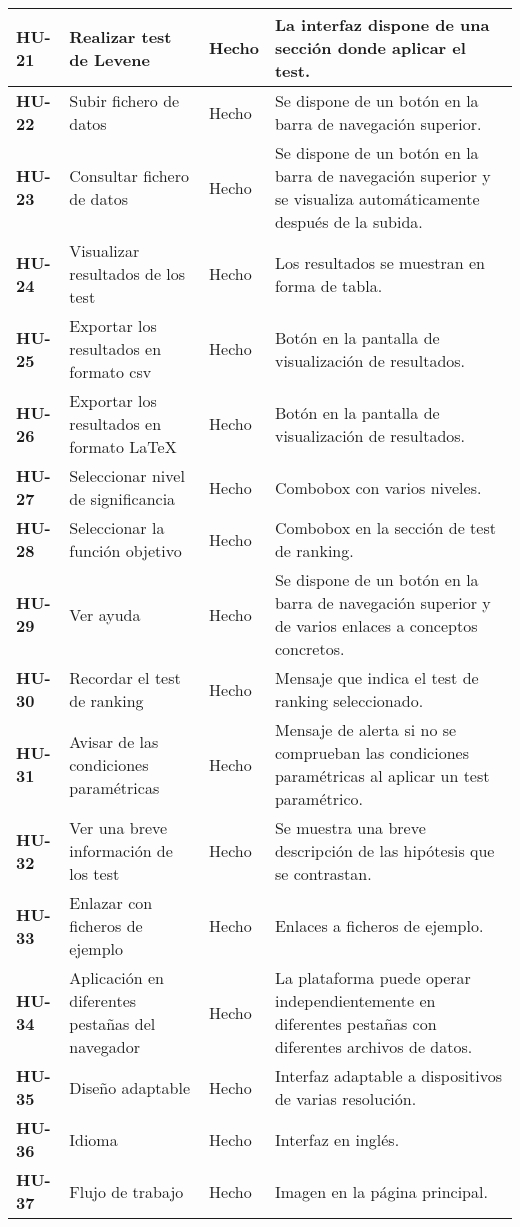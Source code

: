\begin{center}
\begin{longtable}[H]{| p{2cm} | p{4.25cm} | p{1cm} | p{5cm} |}
	\textbf{HU-21} & Realizar test de Levene & Hecho & La interfaz dispone de una sección donde aplicar el test. \\ \hline
	\textbf{HU-22} & Subir fichero de datos & Hecho & Se dispone de un botón en la barra de navegación superior. \\ \hline
	\textbf{HU-23} & Consultar fichero de datos & Hecho & Se dispone de un botón en la barra de navegación superior y se visualiza automáticamente después de la subida. \\ \hline
	\textbf{HU-24} & Visualizar resultados de los test & Hecho & Los resultados se muestran en forma de tabla. \\ \hline
	\textbf{HU-25} & Exportar los resultados en formato csv & Hecho & Botón en la pantalla de visualización de resultados. \\ \hline
	\textbf{HU-26} & Exportar los resultados en formato \LaTeX & Hecho & Botón en la pantalla de visualización de resultados. \\ \hline
	\textbf{HU-27} & Seleccionar nivel de significancia & Hecho & Combobox con varios niveles. \\ \hline
	\textbf{HU-28} & Seleccionar la función objetivo & Hecho & Combobox en la sección de test de ranking. \\ \hline
	\textbf{HU-29} & Ver ayuda & Hecho & Se dispone de un botón en la barra de navegación superior y de varios enlaces a conceptos concretos. \\ \hline
	\textbf{HU-30} & Recordar el test de ranking & Hecho & Mensaje que indica el test de ranking seleccionado. \\ \hline
	\textbf{HU-31} & Avisar de las condiciones paramétricas & Hecho & Mensaje de alerta si no se comprueban las condiciones paramétricas al aplicar un test paramétrico. \\ \hline
	\textbf{HU-32} & Ver una breve información de los test & Hecho & Se muestra una breve descripción de las hipótesis que se contrastan. \\ \hline
	\textbf{HU-33} & Enlazar con ficheros de ejemplo & Hecho & Enlaces a ficheros de ejemplo. \\ \hline
	\textbf{HU-34} & Aplicación en diferentes pestañas del navegador & Hecho & La plataforma puede operar independientemente en diferentes pestañas con diferentes archivos de datos. \\ \hline
	\textbf{HU-35} & Diseño adaptable & Hecho & Interfaz adaptable a dispositivos de varias resolución. \\ \hline
	\textbf{HU-36} & Idioma & Hecho & Interfaz en inglés. \\ \hline
	\textbf{HU-37} & Flujo de trabajo & Hecho & Imagen en la página principal. \\ \hline
\end{longtable}
\end{center}
